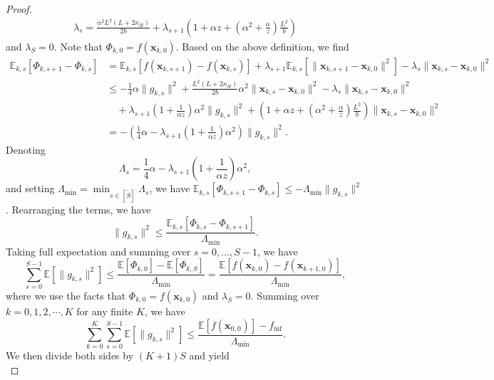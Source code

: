\documentclass[10pt,a4paper]{amsart}
\newcommand{\bx}{\boldsymbol{x}}
\begin{document}
\begin{proof}
\begin{align*}
    \lambda_s = \frac{\alpha^2 L^2(L+ 2\kappa_H)}{2b} + \lambda_{s+1}\left(1+\alpha z+\left(\alpha^2 + \frac{\alpha}{ z}\right)\frac{ L^2}{b}\right)
\end{align*}
and $\lambda_S=0$. Note that $\Phi_{k,0} = f(\bx_{k,0})$.
Based on the above definition, we find
\begin{align*}
   \mathbb{E}_{k,s}[\Phi_{k,s+1} - \Phi_{k,s}] & = \mathbb{E}_{k,s}[f(\bx_{k,s+1}) - f(\bx_{k,s})] + \lambda_{s+1} \mathbb{E}_{k,s}[\|\bx_{k,s+1} - \bx_{k,0}\|^2] - \lambda_s\|\bx_{k,s} - \bx_{k,0}\|^2 \\
   & \leq -\frac{1}{4}\alpha\|g_{k,s}\|^2 + \frac{L^2(L + 2\kappa_H)}{2b} \alpha^2 \|\bx_{k,s} - \bx_{k,0}\|^2  - \lambda_s\|\bx_{k,s} - \bx_{k,0}\|^2 \\
   & \quad + \lambda_{s+1}\left(1+\frac{1}{\alpha z}\right)\alpha^2\|g_{k,s}\|^2 + \left(1+\alpha z+\left(\alpha^2 + \frac{\alpha}{ z}\right)\frac{ L^2}{b}\right) \|\bx_{k,s} - \bx_{k,0}\|^2\\
   & = -\left(\frac{1}{4}\alpha - \lambda_{s+1}\left(1+\frac{1}{\alpha z}\right)\alpha^2\right)\|g_{k,s}\|^2.
\end{align*}
Denoting
\begin{equation*}
    \Lambda_s = \frac{1}{4}\alpha - \lambda_{s+1}\left(1+\frac{1}{\alpha z}\right)\alpha^2, 
\end{equation*}
and setting $\Lambda_{\min} = \min_{s\in[\tilde{S}]} \Lambda_s$, we have $\mathbb{E}_{k,s} [\Phi_{k,s+1} - \Phi_{k,s}] \leq -\Lambda_{\min}\|g_{k,s}\|^2$. Rearranging the terms, we have
\begin{equation*}
\|g_{k,s}\|^2 \leq \frac{\mathbb{E}_{k,s}[\Phi_{k,s} - \Phi_{k,s+1}]}{\Lambda_{\min}}.
\end{equation*}
Taking full expectation and summing over $s = 0,\dots,S-1$, we have
\begin{equation*}
    \sum_{s=0}^{S-1}\mathbb{E}[\|g_{k,s}\|^2] \leq \frac{\mathbb{E}[\Phi_{k,0}] - \mathbb{E}[\Phi_{k,S}]}{\Lambda_{\min}} = \frac{\mathbb{E}[f(\bx_{k,0}) - f(\bx_{k+1,0})]}{\Lambda_{\min}}, 
\end{equation*}
where we use the facts that $\Phi_{k,0} = f(\bx_{k,0}) $ and $\lambda_S=0$. Summing over $k = 0,1,2,\cdots,K$ for any finite $K$, we have
\begin{equation*}
    \sum_{k=0}^K\sum_{s=0}^{S-1}\mathbb{E}[\|g_{k,s}\|^2] \leq \frac{\mathbb{E}[f(\bx_{0,0})] - f_{\inf}}{\Lambda_{\min}}.
\end{equation*}
We then divide both sides by $(K+1)S$ and yield
\begin{equation}\label{thm:conv}

\end{equation}
\end{proof}
\end{document}
